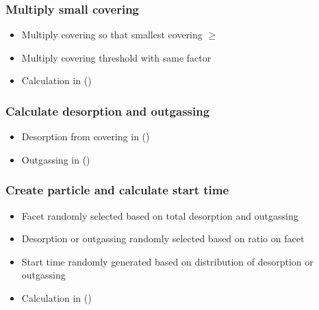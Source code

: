 \subsubsection{Multiply small covering}
\begin{itemize}[noitemsep,topsep=0pt, partopsep=0pt]
\item Multiply covering so that smallest covering $\geq$ 
\item Multiply covering threshold with same factor
\item Calculation in  ()
\end{itemize}

\subsubsection{Calculate desorption and outgassing}
\begin{itemize}[noitemsep,topsep=0pt, partopsep=0pt]
\item Desorption from covering in   ()
\item Outgassing in  ()
\end{itemize}

\subsubsection{Create particle and calculate start time}
\begin{itemize}[noitemsep,topsep=0pt, partopsep=0pt]
\item Facet randomly selected based on total desorption and outgassing
\item Desorption or outgassing randomly selected based on ratio on facet
\item Start time randomly generated based on distribution of desorption or outgassing
\item Calculation in   ()
\end{itemize}

